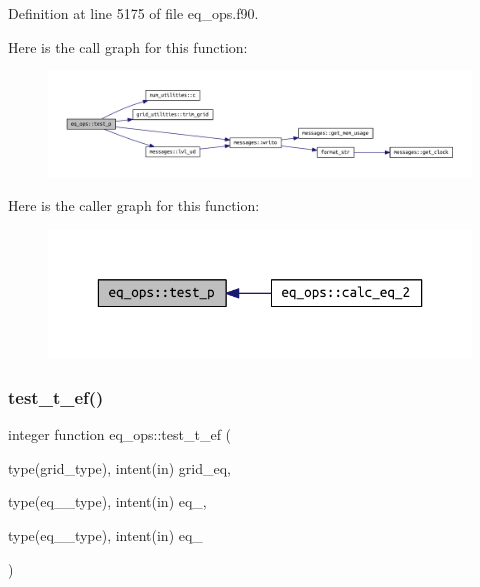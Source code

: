 Definition at line 5175 of file eq\+\_\+ops.\+f90.

Here is the call graph for this function\+:
\nopagebreak
\begin{figure}[H]
\begin{center}
\leavevmode
\includegraphics[width=350pt]{namespaceeq__ops_a38b723f6ed5d2e2772c9c3ad14d5ffd4_cgraph}
\end{center}
\end{figure}
Here is the caller graph for this function\+:
\nopagebreak
\begin{figure}[H]
\begin{center}
\leavevmode
\includegraphics[width=336pt]{namespaceeq__ops_a38b723f6ed5d2e2772c9c3ad14d5ffd4_icgraph}
\end{center}
\end{figure}
\mbox{\label{namespaceeq__ops_a1f5049c3e309fa23ee46fd116c9344f1}} 
\subsubsection{\texorpdfstring{test\+\_\+t\+\_\+ef()}{test\_t\_ef()}}
{\footnotesize\ttfamily integer function eq\+\_\+ops\+::test\+\_\+t\+\_\+ef (\begin{DoxyParamCaption}\item[{type(grid\+\_\+type), intent(in)}]{grid\+\_\+eq,  }\item[{type(eq\+\_\+1\+\_\+type), intent(in)}]{eq\+\_,  }\item[{type(eq\+\_\+2\+\_\+type), intent(in)}]{eq\+\_ }\end{DoxyParamCaption})}




